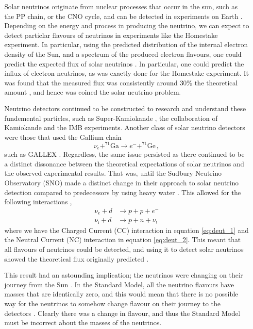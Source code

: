 Solar neutrinos originate from nuclear processes that occur in the sun, such as the PP chain, or the CNO cycle, and can be detected in experiments on Earth \cite{solar_nu}. Depending on the energy and process in producing the neutrino, we can expect to detect particlar flavours of neutrinos in experiments like the Homestake experiment. In particular, using the predicted distribution of the internal electron density of the Sun, and a spectrum of the produced electron flavours, one could predict the expected flux of solar neutrinos \cite{solar_nu}. In particular, one could predict the influx of electron neutrinos, as was exactly done for the Homestake experiment. It was found that the measured flux was consistently around 30\% the theoretical amount \cite{davis, bahcall, solar_nu}, and hence was coined the solar neutrino problem.

Neutrino detectors continued to be constructed to research and understand these fundemental particles, such as Super-Kamiokande \cite{superk}, the collaboration of Kamiokande \cite{kam} and the IMB \cite{imb} experiments. Another class of solar neutrino detectors were those that used the Gallium chain
\begin{equation}\label{eq:gal}
  \nu_{e} + ^{71}\text{Ga} \to e^{-} + ^{71}\text{Ge}\, ,
\end{equation}
such as GALLEX \cite{gallex}. Regardless, the same issue persisted as there continued to be a distinct dissonance between the theoretical expectations of solar neutrinos and the observed experimental results. That was, until the Sudbury Neutrino Observatory (SNO) made a distinct change in their approach to solar neutrino detection compared to predecessors by using heavy water \cite{sno}. This allowed for the following interactions \cite{sno},
\begin{align}
  \nu_{e} + d & \to p + p + e^{-} \label{eq:deut_1} \\
  \nu_{l} + d & \to p + n + \nu_{l} \label{eq:deut_2}
\end{align}
where we have the Charged Current (CC) interaction in equation \ref{eq:deut_1} and the Neutral Current (NC) interaction in equation \ref{eq:deut_2}. This meant that all flavours of neutrinos could be detected, and using it to detect solar neutrinos showed the theoretical flux originally predicted \cite{sno}.

This result had an astounding implication; the neutrinos were changing on their journey from the Sun \cite{sno}. In the Standard Model, all the neutrino flavours have masses that are identically zero, and this would mean that there is no possible way for the neutrinos to somehow change flavour on their journey to the detectors \cite{solar_nu}. Clearly there was a change in flavour, and thus the Standard Model must be incorrect about the masses of the neutrinos.

